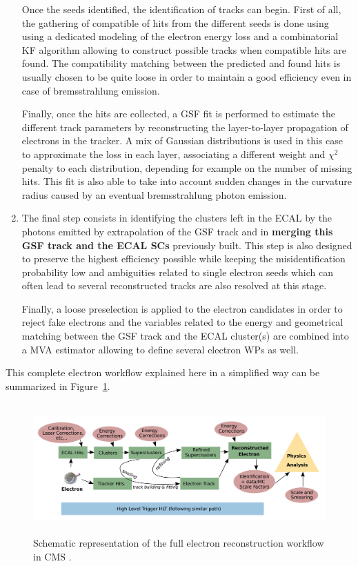 \documentclass[a4paper, 10pt, openright]{report}
\begin{document}
\begin{enumerate}
Once the seeds identified, the identification of tracks can begin. First of all, the gathering of compatible of hits from the different seeds is done using using a dedicated modeling of the electron energy loss and a combinatorial \ac{KF} algorithm allowing to construct possible tracks when compatible hits are found. The compatibility matching between the predicted and found hits is usually chosen to be quite loose in order to maintain a good efficiency even in case of bremsstrahlung emission.

Finally, once the hits are collected, a \ac{GSF} fit is performed to estimate the different track parameters by reconstructing the layer-to-layer propagation of electrons in the tracker. A mix of Gaussian distributions is used in this case to approximate the loss in each layer, associating a different weight and $\chi^2$ penalty to each distribution, depending for example on the number of missing hits. This fit is also able to take into account sudden changes in the curvature radius caused by an eventual bremsstrahlung photon emission.

\item The final step consists in identifying the clusters left in the \ac{ECAL} by the photons emitted by extrapolation of the \ac{GSF} track and in \textbf{merging this \ac{GSF} track and the \ac{ECAL} \acp{SC}} previously built. This step is also designed to preserve the highest efficiency possible while keeping the misidentification probability low and ambiguities related to single electron seeds which can often lead to several reconstructed tracks are also resolved at this stage.

Finally, a loose preselection is applied to the electron candidates in order to reject fake electrons and the variables related to the energy and geometrical matching between the \ac{GSF} track and the \ac{ECAL} cluster(s) are combined into a \acf{MVA} estimator allowing to define several electron \acp{WP} as well.
\end{enumerate}

This complete electron workflow explained here in a simplified way can be summarized in Figure~\ref{fig:EleWorkflow}.

\begin{figure}[htbp]
\begin{center}
\includegraphics[width=14cm, height=5cm]{figs/EleWorkflow.png}
\caption{Schematic representation of the full electron reconstruction workflow in \ac{CMS} \cite{EleWorkflow}.}
\label{fig:EleWorkflow}
\end{center}
\end{figure}
\end{document}
